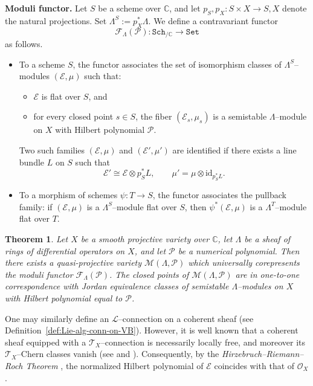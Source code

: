 \documentclass[12pt,reqno]{amsart}
\numberwithin{equation}{subsection}
\newtheorem{thm}[equation]{Theorem}
\theoremstyle{definition}
\theoremstyle{theorem}
\begin{document}
\medskip
\noindent
\textbf{Moduli functor.}
Let $S$ be a scheme over $\mathbb{C}$, and let $p_{S}, p_{X} : S \times X \longrightarrow S, X$
denote the natural projections. Set $\Lambda^{S} := p_{X}^{*}\Lambda$.
We define a contravariant functor
\[
\mathcal{F}_{\Lambda}(\mathcal{P}) : \texttt{Sch}_{/\mathbb{C}} \longrightarrow \texttt{Set}
\]
as follows.

\begin{itemize}
	\item To a scheme $S$, the functor associates the set of isomorphism classes of $\Lambda^{S}$--modules $(\mathcal{E},\mu)$ such that:
	\begin{itemize}
		\item $\mathcal{E}$ is flat over $S$, and
		\item for every closed point $s \in S$, the fiber $(\mathcal{E}_{s},\mu_{s})$ is a semistable $\Lambda$--module on $X$ with Hilbert polynomial $\mathcal{P}$.
	\end{itemize}
	Two such families $(\mathcal{E},\mu)$ and $(\mathcal{E}',\mu')$ are identified if there exists a line bundle $L$ on $S$ such that
	\[
	\mathcal{E}' \cong \mathcal{E} \otimes p_{S}^{*}L,
	\qquad
	\mu' = \mu \otimes \mathrm{id}_{p_{S}^{*}L}.
	\]
	\item To a morphism of schemes $\psi : T \to S$, the functor associates the pullback family: if $(\mathcal{E},\mu)$ is a $\Lambda^{S}$--module flat over $S$, then
	$\psi^{*}(\mathcal{E},\mu)$ is a $\Lambda^{T}$--module flat over $T$.
\end{itemize}

\begin{thm}\label{moduli-of-Lambda-module}\cite[\S\,4, Th 4.7.]{CT.Simpson-1994}
Let $X$ be a smooth projective variety over $\mathbb{C}$, let $\Lambda$ be a sheaf of rings of differential operators on $X$, and let $\mathcal{P}$ be a numerical polynomial. 
Then there exists a quasi-projective variety $\mathcal{M}(\Lambda,\mathcal{P})$ which universally corepresents the moduli functor $\mathcal{F}_{\Lambda}(\mathcal{P})$. 
The closed points of $\mathcal{M}(\Lambda,\mathcal{P})$ are in one-to-one correspondence with Jordan equivalence classes of semistable $\Lambda$--modules on $X$ with Hilbert polynomial equal to $\mathcal{P}$.

\end{thm}


One may similarly define an $\mathcal{L}$--connection on a coherent sheaf (see Definition~\eqref{def:Lie-alg-conn-on-VB}). However, it is well known that a coherent sheaf equipped with a $\mathcal{T}_{X}$--connection is necessarily locally free, and moreover its $\mathcal{T}_{X}$--Chern classes vanish
(see \cite[\S\,VI, Proposition~1.7]{A.Borel-1987} and \cite[\S\,3, Theorem~4]{Atiyah-1957}). Consequently, by the \textit{Hirzebruch--Riemann--Roch Theorem} \cite{A. Moroianu-2007}, the normalized Hilbert polynomial of $\mathcal{E}$ coincides with that of $\mathcal{O}_{X}$.
\end{document}
